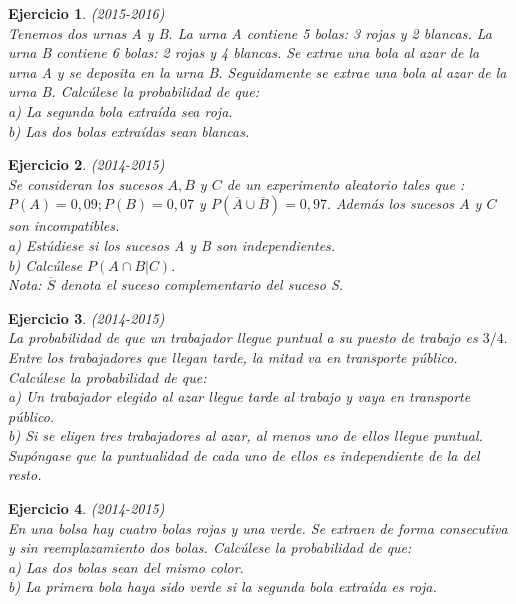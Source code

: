 \documentclass[12pt, a4paper]{amsart}
\newtheorem{ejer}{Ejercicio}
\begin{document}
\begin{ejer}\em (2015-2016)\\
Tenemos dos urnas A y B. La urna A contiene 5 bolas: 3 rojas y 2 blancas. La urna B contiene 6 bolas: 2 rojas y
4 blancas. Se extrae una bola al azar de la urna A y se deposita en la urna B. Seguidamente se extrae una bola
al azar de la urna B. Calcúlese la probabilidad de que:\\
a) La segunda bola extraída sea roja.\\
b) Las dos bolas extraídas sean blancas.
\end{ejer}

\begin{ejer}\em (2014-2015)\\
Se consideran los sucesos $A, B$ y $C$ de un experimento aleatorio tales que : $P(A) = 0, 09; P(B) = 0, 07$ y $P(\overline{A} \cup \overline{B}) = 0, 97.$ Además los sucesos $A$ y $C$ son incompatibles.\\
a) Estúdiese si los sucesos A y B son independientes.\\
b) Calcúlese $P(A \cap B | C).$\\
Nota: $\overline{S}$ denota el suceso complementario del suceso S.
\end{ejer}

\begin{ejer}\em (2014-2015)\\
La probabilidad de que un trabajador llegue puntual a su puesto de trabajo es $3/4.$ Entre los trabajadores que
llegan tarde, la mitad va en transporte público. Calcúlese la probabilidad de que:\\
a) Un trabajador elegido al azar llegue tarde al trabajo y vaya en transporte público.\\
b) Si se eligen tres trabajadores al azar, al menos uno de ellos llegue puntual. Supóngase que la puntualidad de
cada uno de ellos es independiente de la del resto.
\end{ejer}

\begin{ejer}\em (2014-2015)\\
En una bolsa hay cuatro bolas rojas y una verde. Se extraen de forma consecutiva y sin reemplazamiento dos bolas. Calcúlese la probabilidad de que:\\
a) Las dos bolas sean del mismo color.\\
b) La primera bola haya sido verde si la segunda bola extraída es roja.
\end{ejer}
\end{document}

